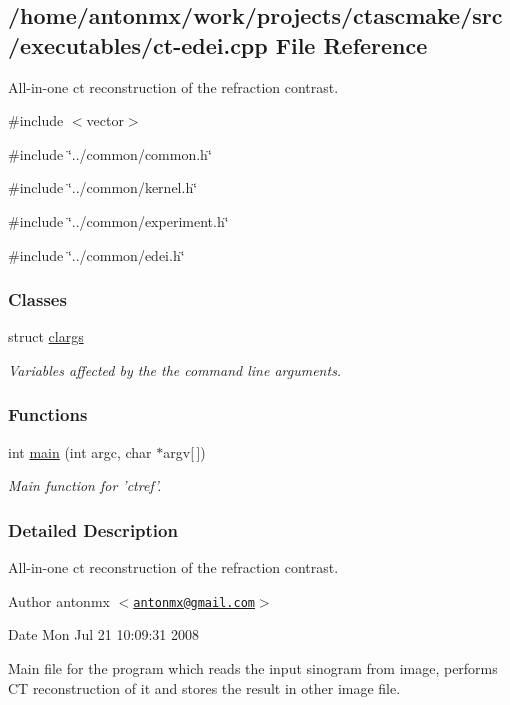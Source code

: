 \hypertarget{ct-edei_8cpp}{
\subsection{/home/antonmx/work/projects/ctascmake/src/executables/ct-\/edei.cpp File Reference}
\label{ct-edei_8cpp}
}


All-\/in-\/one ct reconstruction of the refraction contrast.  


{\ttfamily \#include $<$vector$>$}\par
{\ttfamily \#include \char`\"{}../common/common.h\char`\"{}}\par
{\ttfamily \#include \char`\"{}../common/kernel.h\char`\"{}}\par
{\ttfamily \#include \char`\"{}../common/experiment.h\char`\"{}}\par
{\ttfamily \#include \char`\"{}../common/edei.h\char`\"{}}\par
\subsubsection*{Classes}
\begin{DoxyCompactItemize}
\item 
struct \hyperlink{structclargs}{clargs}
\begin{DoxyCompactList}\small\item\em Variables affected by the the command line arguments. \item\end{DoxyCompactList}\end{DoxyCompactItemize}
\subsubsection*{Functions}
\begin{DoxyCompactItemize}
\item 
int \hyperlink{ct-edei_8cpp_a0ddf1224851353fc92bfbff6f499fa97}{main} (int argc, char $\ast$argv\mbox{[}$\,$\mbox{]})
\begin{DoxyCompactList}\small\item\em Main function for 'ctref'. \item\end{DoxyCompactList}\end{DoxyCompactItemize}


\subsubsection{Detailed Description}
All-\/in-\/one ct reconstruction of the refraction contrast. \begin{DoxyAuthor}{Author}
antonmx $<$\href{mailto:antonmx@gmail.com}{\tt antonmx@gmail.com}$>$ 
\end{DoxyAuthor}
\begin{DoxyDate}{Date}
Mon Jul 21 10:09:31 2008
\end{DoxyDate}
Main file for the program which reads the input sinogram from image, performs CT reconstruction of it and stores the result in other image file. 

